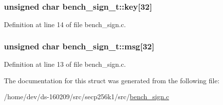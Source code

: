 \subsubsection[{key}]{\setlength{\rightskip}{0pt plus 5cm}unsigned char bench\+\_\+sign\+\_\+t\+::key\mbox{[}32\mbox{]}}\label{structbench__sign__t_ae58b8838304b713a59437d4ec87b15d8}


Definition at line 14 of file bench\+\_\+sign.\+c.

\hypertarget{structbench__sign__t_a8710d756cc35409f8c230a89b9a52f71}{}
\subsubsection[{msg}]{\setlength{\rightskip}{0pt plus 5cm}unsigned char bench\+\_\+sign\+\_\+t\+::msg\mbox{[}32\mbox{]}}\label{structbench__sign__t_a8710d756cc35409f8c230a89b9a52f71}


Definition at line 13 of file bench\+\_\+sign.\+c.



The documentation for this struct was generated from the following file\+:\begin{DoxyCompactItemize}
\item 
/home/dev/ds-\/160209/src/secp256k1/src/\hyperlink{bench__sign_8c}{bench\+\_\+sign.\+c}\end{DoxyCompactItemize}
